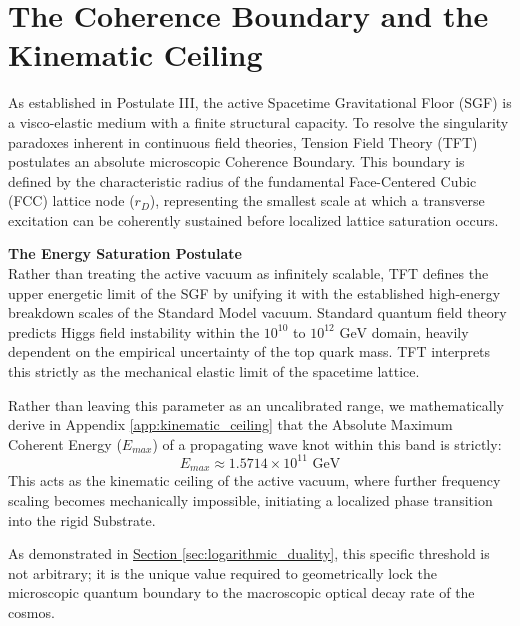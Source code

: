 \section{The Coherence Boundary and the Kinematic Ceiling}
As established in Postulate III, the active Spacetime Gravitational Floor (SGF) is a visco-elastic medium with a finite structural capacity. To resolve the singularity paradoxes inherent in continuous field theories, Tension Field Theory (TFT) postulates an absolute microscopic Coherence Boundary. This boundary is defined by the characteristic radius of the fundamental Face-Centered Cubic (FCC) lattice node ($r_D$), representing the smallest scale at which a transverse excitation can be coherently sustained before localized lattice saturation occurs.

\textbf{The Energy Saturation Postulate}\\
Rather than treating the active vacuum as infinitely scalable, TFT defines the upper energetic limit of the SGF by unifying it with the established high-energy breakdown scales of the Standard Model vacuum. Standard quantum field theory predicts Higgs field instability within the $10^{10}$ to $10^{12} \text{ GeV}$ domain, heavily dependent on the empirical uncertainty of the top quark mass. TFT interprets this strictly as the mechanical elastic limit of the spacetime lattice.

Rather than leaving this parameter as an uncalibrated range, we mathematically derive in Appendix \ref{app:kinematic_ceiling} that the Absolute Maximum Coherent Energy ($E_{max}$) of a propagating wave knot within this band is strictly:
\begin{equation}
    E_{max} \approx 1.5714 \times 10^{11} \text{ GeV}
\end{equation}
This acts as the kinematic ceiling of the active vacuum, where further frequency scaling becomes mechanically impossible, initiating a localized phase transition into the rigid Substrate.

As demonstrated in \hyperref[sec:logarithmic_duality]{Section \ref{sec:logarithmic_duality}}, this specific threshold is not arbitrary; it is the unique value required to geometrically lock the microscopic quantum boundary to the macroscopic optical decay rate of the cosmos.


